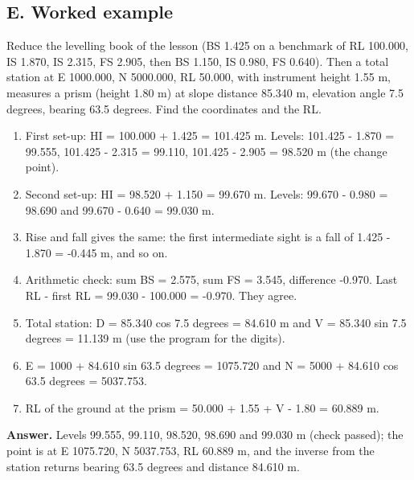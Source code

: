 \documentclass[11pt,a4paper]{article}
\begin{document}
\subsection*{E. Worked example}
Reduce the levelling book of the lesson (BS 1.425 on a benchmark of RL 100.000, IS 1.870, IS 2.315, FS 2.905, then BS 1.150, IS 0.980, FS 0.640). Then a total station at E 1000.000, N 5000.000, RL 50.000, with instrument height 1.55 m, measures a prism (height 1.80 m) at slope distance 85.340 m, elevation angle 7.5 degrees, bearing 63.5 degrees. Find the coordinates and the RL.
\begin{enumerate}[nosep]
\item First set-up: HI = 100.000 + 1.425 = 101.425 m. Levels: 101.425 - 1.870 = 99.555, 101.425 - 2.315 = 99.110, 101.425 - 2.905 = 98.520 m (the change point).
\item Second set-up: HI = 98.520 + 1.150 = 99.670 m. Levels: 99.670 - 0.980 = 98.690 and 99.670 - 0.640 = 99.030 m.
\item Rise and fall gives the same: the first intermediate sight is a fall of 1.425 - 1.870 = -0.445 m, and so on.
\item Arithmetic check: sum BS = 2.575, sum FS = 3.545, difference -0.970. Last RL - first RL = 99.030 - 100.000 = -0.970. They agree.
\item Total station: D = 85.340 cos 7.5 degrees = 84.610 m and V = 85.340 sin 7.5 degrees = 11.139 m (use the program for the digits).
\item E = 1000 + 84.610 sin 63.5 degrees = 1075.720 and N = 5000 + 84.610 cos 63.5 degrees = 5037.753.
\item RL of the ground at the prism = 50.000 + 1.55 + V - 1.80 = 60.889 m.
\end{enumerate}
\textbf{Answer.} Levels 99.555, 99.110, 98.520, 98.690 and 99.030 m (check passed); the point is at E 1075.720, N 5037.753, RL 60.889 m, and the inverse from the station returns bearing 63.5 degrees and distance 84.610 m.
\end{document}

